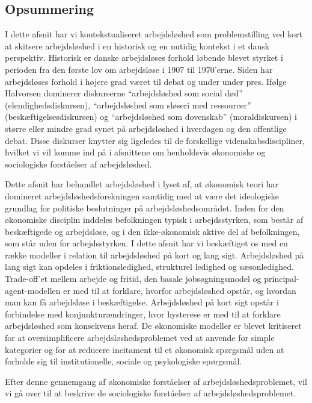 \subsection{Opsummering} 

I dette afsnit har vi kontekstualiseret arbejdsløshed som problemstilling ved kort at skitsere arbejdsløshed i en historisk og en nutidig kontekst i et dansk perspektiv. Historisk er danske arbejdsløses forhold løbende blevet styrket i perioden fra den første lov om arbejdsløse i 1907 til 1970'erne. Siden har arbejdsløses forhold i højere grad været til debat og under under pres. Ifølge Halvorsen dominerer diskurserne “arbejdsløshed som social død” (elendighedsdiskursen), “arbejdsløshed som sløseri med ressourcer” (beskæftigelsesdiskursen) og “arbejdsløshed som dovenskab” (moraldiskursen) i større eller mindre grad synet på arbejdsløshed i hverdagen og den offentlige debat. Disse diskurser knytter sig ligeledes til de forskellige videnskabsdiscipliner, hvilket vi vil komme ind på i afsnittene om henholdsvis økonomiske og sociologiske forståelser af arbejdsløshed.


Dette afsnit har behandlet arbejdsløshed i lyset af, at økonomisk teori har domineret arbejdsløshedsforskningen samtidig med at være det ideologiske grundlag for politiske beslutninger på arbejdsløshedsområdet. Inden for den økonomiske disciplin inddeles befolkningen typisk i arbejdsstyrken, som består af beskæftigede og arbejdsløse, og i den ikke-økonomisk aktive del af befolkningen, som står uden for arbejdsstyrken. I dette afsnit har vi beskæftiget os med en række modeller i relation til arbejdsløshed på kort og lang sigt. Arbejdsløshed på lang sigt kan opdeles i friktionsledighed, strukturel ledighed og sæsonledighed. Trade-off'et mellem arbejde og fritid, den basale jobsøgningsmodel og principal-agent-modellen er med til at forklare, hvorfor arbejdsløshed opstår, og hvordan man kan få arbejdsløse i beskæftigelse. Arbejdsløshed på kort sigt  opstår i forbindelse med konjunkturændringer, hvor hysterese er med til at forklare arbejdsløshed som konsekvens heraf. De økonomiske modeller er blevet kritiseret for at oversimplificere arbejdsløshedsproblemet ved at anvende for simple kategorier og for at reducere incitament til et økonomisk spørgsmål uden at forholde sig til institutionelle, sociale og psykologiske spørgsmål.

Efter denne gennemgang af økonomiske forståelser af arbejdsløshedsproblemet, vil vi gå over til at beskrive de sociologiske forståelser af arbejdsløshedsproblemet.


